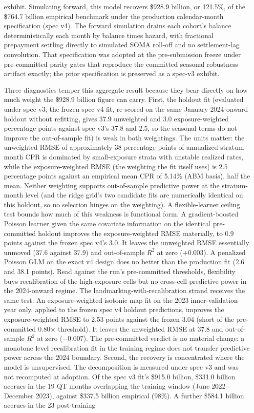 \documentclass[12pt]{article}
\begin{document}
exhibit. Simulating forward, this model recovers \$928.9 billion, or 121.5\%, of the \$764.7 billion empirical benchmark under the production calendar-month specification (spec v4). The forward simulation drains each cohort's balance deterministically each month by balance times hazard, with fractional prepayment settling directly to simulated SOMA roll-off and no settlement-lag convolution. That specification was adopted at the pre-submission freeze under pre-committed parity gates that reproduce the committed seasonal robustness artifact exactly; the prior specification is preserved as a spec-v3 exhibit.

Three diagnostics temper this aggregate result because they bear directly on how much weight the \$928.9 billion figure can carry. First, the holdout fit (evaluated under spec v3; the frozen spec v4 fit, re-scored on the same January-2024-onward holdout without refitting, gives 37.9 unweighted and 3.0 exposure-weighted percentage points against spec v3's 37.8 and 2.5, so the seasonal terms do not improve the out-of-sample fit) is weak in both weightings. The units matter: the unweighted RMSE of approximately 38 percentage points of annualized stratum-month CPR is dominated by small-exposure strata with unstable realized rates, while the exposure-weighted RMSE (the weighting the fit itself uses) is 2.5 percentage points against an empirical mean CPR of 5.14\% (ABM basis), half the mean. Neither weighting supports out-of-sample predictive power at the stratum-month level (and the ridge grid's two candidate fits are numerically identical on this holdout, so no selection hinges on the weighting). A flexible-learner ceiling test bounds how much of this weakness is functional form. A gradient-boosted Poisson learner given the same covariate information on the identical pre-committed holdout improves the exposure-weighted RMSE materially, to 0.9 points against the frozen spec v4's 3.0. It leaves the unweighted RMSE essentially unmoved (37.6 against 37.9) and out-of-sample $R^2$ at zero ($+0.003$). A penalized Poisson GLM on the exact v4 design does no better than the production fit (2.6 and 38.1 points). Read against the run's pre-committed thresholds, flexibility buys recalibration of the high-exposure cells but no cross-cell predictive power in the 2024-onward regime. The landmarking-with-recalibration strand receives the same test. An exposure-weighted isotonic map fit on the 2023 inner-validation year only, applied to the frozen spec v4 holdout predictions, improves the exposure-weighted RMSE to 2.53 points against the frozen 3.04 (short of the pre-committed 0.80$\times$ threshold). It leaves the unweighted RMSE at 37.8 and out-of-sample $R^2$ at zero ($-0.007$). The pre-committed verdict is no material change: a monotone level recalibration fit in the training regime does not transfer predictive power across the 2024 boundary. Second, the recovery is concentrated where the model is unsupervised. The decomposition is measured under spec v3 and was not recomputed at adoption. Of the spec v3 fit's \$915.0 billion, \$331.0 billion accrues in the 19 QT months overlapping the training window (June 2022--December 2023), against \$337.5 billion empirical (98\%). A further \$584.1 billion accrues in the 23 post-training 
\end{document}
